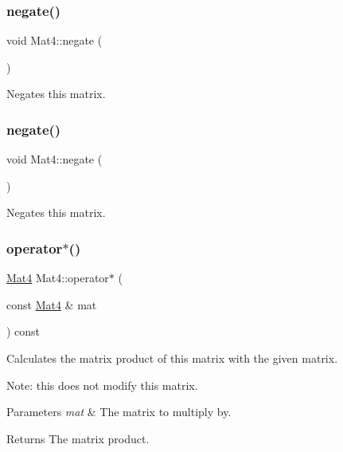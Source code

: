 \subsubsection{\texorpdfstring{negate()}{negate()}\hspace{0.1cm}{\footnotesize\ttfamily [1/2]}}
{\footnotesize\ttfamily void Mat4\+::negate (\begin{DoxyParamCaption}{ }\end{DoxyParamCaption})}

Negates this matrix. \mbox{\label{classMat4_a4e99a7b8e550d6a0f1e9a5d9f1305206}} 
\subsubsection{\texorpdfstring{negate()}{negate()}\hspace{0.1cm}{\footnotesize\ttfamily [2/2]}}
{\footnotesize\ttfamily void Mat4\+::negate (\begin{DoxyParamCaption}{ }\end{DoxyParamCaption})}

Negates this matrix. \mbox{\label{classMat4_adfc2da7f18cf258791b388bf3333d7ef}} 
\subsubsection{\texorpdfstring{operator$\ast$()}{operator*()}\hspace{0.1cm}{\footnotesize\ttfamily [1/2]}}
{\footnotesize\ttfamily \hyperlink{classMat4}{Mat4} Mat4\+::operator$\ast$ (\begin{DoxyParamCaption}\item[{const \hyperlink{classMat4}{Mat4} \&}]{mat }\end{DoxyParamCaption}) const\hspace{0.3cm}{\ttfamily [inline]}}

Calculates the matrix product of this matrix with the given matrix.

Note\+: this does not modify this matrix.


\begin{DoxyParams}{Parameters}
{\em mat} & The matrix to multiply by. \\
\hline
\end{DoxyParams}
\begin{DoxyReturn}{Returns}
The matrix product. 
\end{DoxyReturn}
\mbox{\label{classMat4_adfc2da7f18cf258791b388bf3333d7ef}} 
